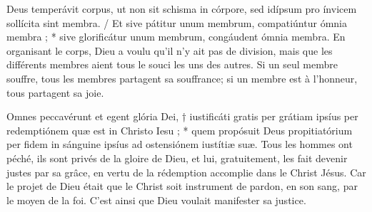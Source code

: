 \documentclass[Session2026.tex]{subfiles}
\begin{document}
{Deus temperávit corpus, ut non sit schisma in córpore, sed idípsum
pro ínvicem sollícita sint membra. / Et sive pátitur unum membrum,
compatiúntur ómnia membra ; * sive glorificátur unum membrum,
congáudent ómnia membra.}
{En organisant le corps, Dieu
a voulu qu’il n’y ait pas
de division, mais que les différents
membres aient tous le
souci les uns des autres. Si
un seul membre souffre, tous
les membres partagent sa souffrance; si un membre est à l’honneur,
tous partagent sa joie.}



\vspace{5mm}


\newpage





\pagebreak



{Omnes peccavérunt et egent glória Dei, † iustificáti gratis per grátiam
ipsíus per redemptiónem quæ est in Christo Iesu ; * quem propósuit Deus
propitiatórium per fidem in sánguine ipsíus ad ostensiónem iustítiæ suæ.}
{Tous les hommes ont péché,
ils sont privés de la gloire de
Dieu, et lui, gratuitement, les fait
devenir justes par sa grâce, en
vertu de la rédemption accomplie
dans le Christ Jésus. Car le
projet de Dieu était que le Christ
soit instrument de pardon, en
son sang, par le moyen de la foi.
C’est ainsi que Dieu voulait manifester
sa justice.}
\end{document}
